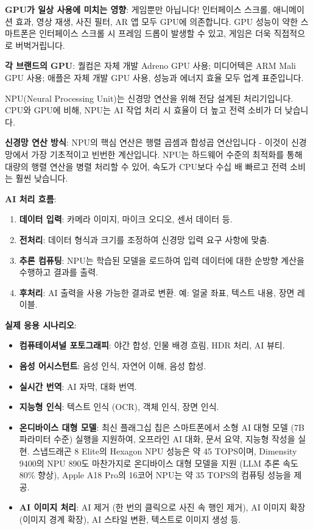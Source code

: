 \textbf{GPU가 일상 사용에 미치는 영향}: 게임뿐만 아닙니다! 인터페이스 스크롤, 애니메이션 효과, 영상 재생, 사진 필터, AR 앱 모두 GPU에 의존합니다. GPU 성능이 약한 스마트폰은 인터페이스 스크롤 시 프레임 드롭이 발생할 수 있고, 게임은 더욱 직접적으로 버벅거립니다.

\textbf{각 브랜드의 GPU}: 퀄컴은 자체 개발 Adreno GPU 사용; 미디어텍은 ARM Mali GPU 사용; 애플은 자체 개발 GPU 사용, 성능과 에너지 효율 모두 업계 표준입니다.


NPU(Neural Processing Unit)는 신경망 연산을 위해 전담 설계된 처리기입니다. CPU와 GPU에 비해, NPU는 AI 작업 처리 시 효율이 더 높고 전력 소비가 더 낮습니다.

\textbf{신경망 연산 방식}: NPU의 핵심 연산은 행렬 곱셈과 합성곱 연산입니다 - 이것이 신경망에서 가장 기초적이고 빈번한 계산입니다. NPU는 하드웨어 수준의 최적화를 통해 대량의 행렬 연산을 병렬 처리할 수 있어, 속도가 CPU보다 수십 배 빠르고 전력 소비는 훨씬 낮습니다.

\textbf{AI 처리 흐름}:

\begin{enumerate}
  \item \textbf{데이터 입력}: 카메라 이미지, 마이크 오디오, 센서 데이터 등.
  \item \textbf{전처리}: 데이터 형식과 크기를 조정하여 신경망 입력 요구 사항에 맞춤.
  \item \textbf{추론 컴퓨팅}: NPU는 학습된 모델을 로드하여 입력 데이터에 대한 순방향 계산을 수행하고 결과를 출력.
  \item \textbf{후처리}: AI 출력을 사용 가능한 결과로 변환. 예: 얼굴 좌표, 텍스트 내용, 장면 레이블.
\end{enumerate}

\textbf{실제 응용 시나리오}:

\begin{itemize}
  \item \textbf{컴퓨테이셔널 포토그래피}: 야간 합성, 인물 배경 흐림, HDR 처리, AI 뷰티.
  \item \textbf{음성 어시스턴트}: 음성 인식, 자연어 이해, 음성 합성.
  \item \textbf{실시간 번역}: AI 자막, 대화 번역.
  \item \textbf{지능형 인식}: 텍스트 인식 (OCR), 객체 인식, 장면 인식.
  \item \textbf{온디바이스 대형 모델}: 최신 플래그십 칩은 스마트폰에서 소형 AI 대형 모델 (7B 파라미터 수준) 실행을 지원하여, 오프라인 AI 대화, 문서 요약, 지능형 작성을 실현. 스냅드래곤 8 Elite의 Hexagon NPU 성능은 약 45 TOPS이며, Dimensity 9400의 NPU 890도 마찬가지로 온디바이스 대형 모델을 지원 (LLM 추론 속도 80\% 향상), Apple A18 Pro의 16코어 NPU는 약 35 TOPS의 컴퓨팅 성능을 제공.
  \item \textbf{AI 이미지 처리}: AI 제거 (한 번의 클릭으로 사진 속 행인 제거), AI 이미지 확장 (이미지 경계 확장), AI 스타일 변환, 텍스트로 이미지 생성 등.
\end{itemize}


